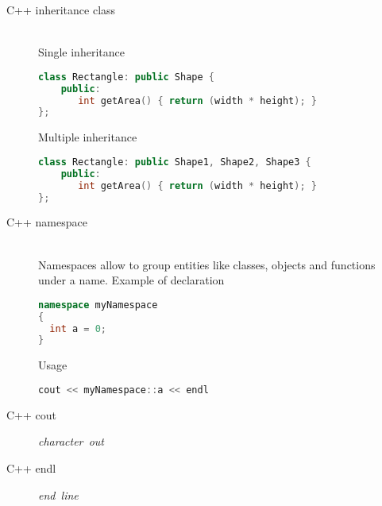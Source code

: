 \documentclass{article}
\begin{document}
\begin{description}
    \item[C++ inheritance class] \mbox{}\\ Single inheritance
\begin{lstlisting}[language=C++]
class Rectangle: public Shape {
    public:
       int getArea() { return (width * height); }
};
\end{lstlisting}
    Multiple inheritance
\begin{lstlisting}[language=C++]
class Rectangle: public Shape1, Shape2, Shape3 {
    public:
       int getArea() { return (width * height); }
};
\end{lstlisting}
    \item[C++ namespace] \mbox{}\\ Namespaces allow to group entities like classes, objects and functions under a name. Example of declaration
\begin{lstlisting}[language=C++]
namespace myNamespace
{
  int a = 0;
}
\end{lstlisting}

Usage

\begin{lstlisting}[language=C++]
cout << myNamespace::a << endl
\end{lstlisting}

    \item[C++ cout] \mbox{\textit{character out}}\\
    \item[C++ endl] \mbox{\textit{end line}}\\

\end{description}
\end{document}
